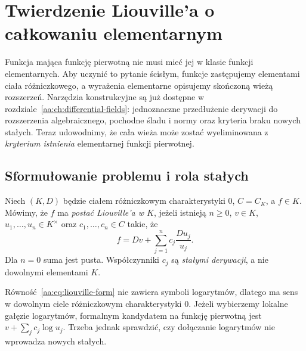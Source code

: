 \chapter{Twierdzenie Liouville'a o całkowaniu elementarnym}
\label{aa:ch:liouville-elementary-integration}

Funkcja mająca funkcję pierwotną nie musi mieć jej w klasie funkcji
elementarnych. Aby uczynić to pytanie ścisłym, funkcje zastępujemy
elementami ciała różniczkowego, a wyrażenia elementarne opisujemy
skończoną wieżą rozszerzeń. Narzędzia konstrukcyjne są już dostępne
w rozdziale~\ref{aa:ch:differential-fields}: jednoznaczne
przedłużenie derywacji do rozszerzenia algebraicznego, pochodne
śladu i normy oraz kryteria braku nowych stałych. Teraz
udowodnimy, że cała wieża może zostać wyeliminowana z
\emph{kryterium istnienia} elementarnej funkcji pierwotnej.

\section{Sformułowanie problemu i rola stałych}

\begin{definicja}
\label{aa:def:liouville-form}
Niech $(K,D)$ będzie ciałem różniczkowym charakterystyki $0$,
$C=C_K$, a $f\in K$. Mówimy, że $f$ ma
\emph{postać Liouville'a w $K$}, jeżeli istnieją
$n\ge0$, $v\in K$, $u_1,\ldots,u_n\in K^\times$ oraz
$c_1,\ldots,c_n\in C$ takie, że
\begin{equation}\label{aa:eq:liouville-form}
 f=Dv+\sum_{j=1}^{n}c_j\frac{Du_j}{u_j}.
\end{equation}
\begingroup
\makeatletter
\protected@edef\@currentlabel{\p@equation\theequation}
\ifdefined\theHequation
  \edef\@currentHref{equation.\theHequation}
\fi
\label{eq:liouville}
\makeatother
\endgroup
Dla $n=0$ suma jest pusta. Współczynniki $c_j$
są \emph{stałymi derywacji}, a nie dowolnymi elementami $K$.
\end{definicja}

Równość~\eqref{aa:eq:liouville-form} nie zawiera
symboli logarytmów, dlatego ma sens w dowolnym
ciele różniczkowym charakterystyki $0$.
Jeżeli wybierzemy lokalne gałęzie logarytmów,
formalnym kandydatem na funkcję pierwotną jest
$v+\sum_j c_j\log u_j$. Trzeba jednak sprawdzić,
czy dołączanie logarytmów nie wprowadza nowych stałych.

